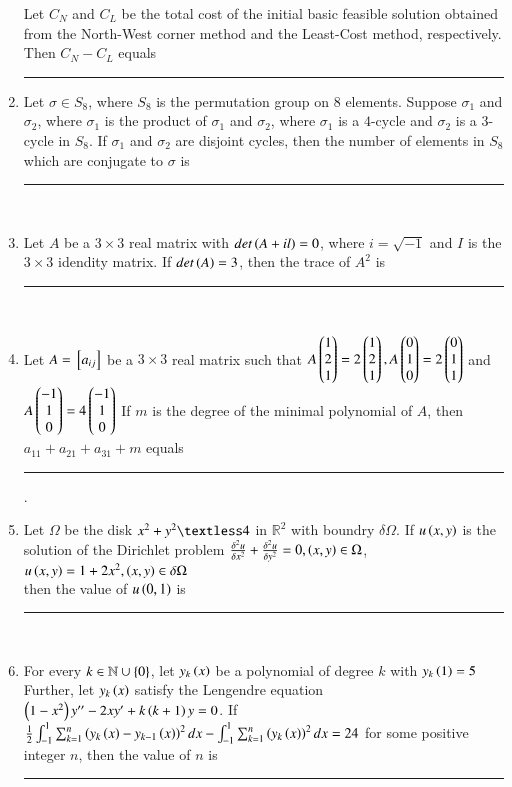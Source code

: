 \documentclass[journal]{IEEEtran}
\begin{document}
\begin{enumerate}
{Let $C_N$ and $C_L$ be the total cost of the initial basic feasible solution obtained from the North-West corner method and the Least-Cost method, respectively. Then $C_N-C_L$ equals \rule{2cm}{0.15mm}
}
\item{
Let $\sigma\in S_8$, where $S_8$ is the permutation group on $8$ elements. Suppose $\sigma_1$ and $\sigma_2$, where $\sigma_1$ is the product of $\sigma_1$ and $\sigma_2$, where $\sigma_1$ is a $4$-cycle and $\sigma_2$ is a $3$-cycle in $S_8$. If $\sigma_1$ and $\sigma_2$ are disjoint cycles, then the number of elements in $S_8$ which are conjugate to $\sigma$ is \rule{2cm}{0.15mm}\\
}
\item{
Let $A$ be a $3\times 3$ real matrix with $det\left(A+il\right)=0$, where $i=\sqrt{-1}$ and $I$ is the $3\times 3$ idendity matrix. If $det\left(A\right)=3$, then the trace of $A^2$ is\rule{2cm}{0.15mm}\\
}
\item{
Let $A={}\left[a_{ij}\right]$ be a $3\times 3$ real matrix such that $A\begin{pmatrix}1\\2\\1\end{pmatrix}=2\begin{pmatrix}1\\2\\1\end{pmatrix},A\begin{pmatrix}0\\1\\0\end{pmatrix}=2\begin{pmatrix}0\\1\\1\end{pmatrix}$ and $A\begin{pmatrix}-1\\1\\0\end{pmatrix}=4\begin{pmatrix}-1\\1\\0\end{pmatrix}$ If $m$ is the degree of the minimal polynomial of $A$, then $a_{11}+a_{21}+a_{31}+m$ equals\rule{2cm}{0.15mm}.\\
}
\item{
Let $\Omega$ be the disk $x^2+y^2\textless 4$ in $\mathbb{R}^2$ with boundry $\delta\Omega$. If $u\left(x,y\right)$ is the solution of the Dirichlet problem $\frac{\delta^2u}{\delta x^2}+\frac{\delta^2u}{\delta y^2}=0,\left(x,y\right)\in\Omega$,\\$u\left(x,y\right)=1+2x^2,\left(x,y\right)\in\delta\Omega$ \\then the value of $u\left(0,1\right)$ is \rule{2cm}{0.15mm}\\ 
}
\item{
For every $k\in\mathbb{N}\cup\left\{0\right\}$, let $y_k\left(x\right)$ be a polynomial of degree $k$ with $y_k\left(1\right)=5$ Further, let $y_k\left(x\right)$ satisfy the Lengendre equation $\left(1-x^2\right)y^{\prime\prime}-2xy^{\prime}+k\left(k+1\right)y=0$. If $\frac{1}{2}\int_{-1}^1\sum_{k=1}^n\left(y_k\left(x\right)-y_{k-1}\left(x\right)\right)^2dx-\int_{-1}^1\sum_{k=1}^n\left(y_k\left(x\right)\right)^2dx=24$ for some positive integer $n$, then the value of $n$ is \rule{2cm}{0.15mm}\\
}
\end{enumerate}
\end{document}
